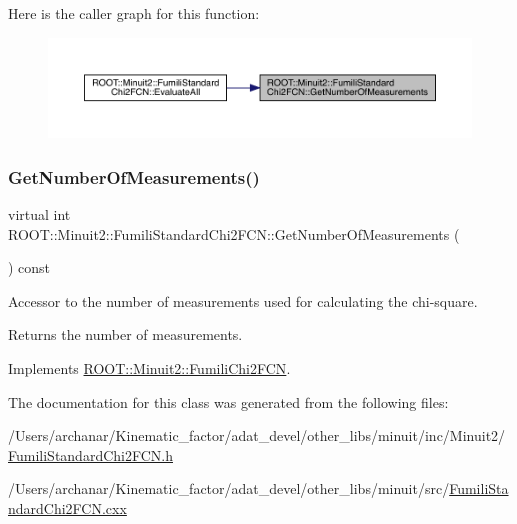 Here is the caller graph for this function\+:\nopagebreak
\begin{figure}[H]
\begin{center}
\leavevmode
\includegraphics[width=350pt]{d8/db2/classROOT_1_1Minuit2_1_1FumiliStandardChi2FCN_a27414beb35c9c18156e6b3781aaf587f_icgraph}
\end{center}
\end{figure}
\mbox{\label{classROOT_1_1Minuit2_1_1FumiliStandardChi2FCN_a868b7c1aa7d2597db475ca99799c9131}} 
\subsubsection{\texorpdfstring{GetNumberOfMeasurements()}{GetNumberOfMeasurements()}\hspace{0.1cm}{\footnotesize\ttfamily [2/2]}}
{\footnotesize\ttfamily virtual int R\+O\+O\+T\+::\+Minuit2\+::\+Fumili\+Standard\+Chi2\+F\+C\+N\+::\+Get\+Number\+Of\+Measurements (\begin{DoxyParamCaption}{ }\end{DoxyParamCaption}) const\hspace{0.3cm}{\ttfamily [virtual]}}

Accessor to the number of measurements used for calculating the chi-\/square.

\begin{DoxyReturn}{Returns}
the number of measurements. 
\end{DoxyReturn}


Implements \mbox{\hyperlink{classROOT_1_1Minuit2_1_1FumiliChi2FCN_afa1acb8484d1c1825de0dd641e301717}{R\+O\+O\+T\+::\+Minuit2\+::\+Fumili\+Chi2\+F\+CN}}.



The documentation for this class was generated from the following files\+:\begin{DoxyCompactItemize}
\item 
/\+Users/archanar/\+Kinematic\+\_\+factor/adat\+\_\+devel/other\+\_\+libs/minuit/inc/\+Minuit2/\mbox{\hyperlink{other__libs_2minuit_2inc_2Minuit2_2FumiliStandardChi2FCN_8h}{Fumili\+Standard\+Chi2\+F\+C\+N.\+h}}\item 
/\+Users/archanar/\+Kinematic\+\_\+factor/adat\+\_\+devel/other\+\_\+libs/minuit/src/\mbox{\hyperlink{FumiliStandardChi2FCN_8cxx}{Fumili\+Standard\+Chi2\+F\+C\+N.\+cxx}}\end{DoxyCompactItemize}
